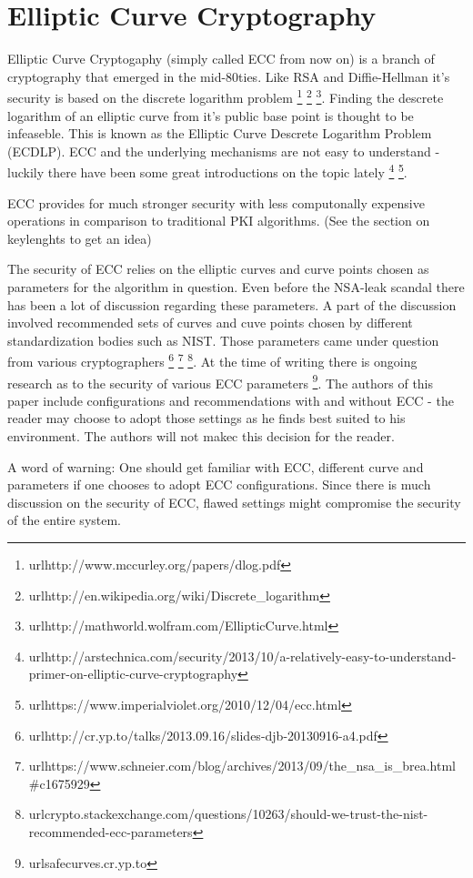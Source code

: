 \section{Elliptic Curve Cryptography}

Elliptic Curve Cryptogaphy (simply called ECC from now on) is a branch of 
cryptography that emerged in the mid-80ties. Like RSA and Diffie-Hellman 
it's security is based on the discrete logarithm problem
\footnote{url{http://www.mccurley.org/papers/dlog.pdf}} 
\footnote{url{http://en.wikipedia.org/wiki/Discrete_logarithm}}
\footnote{url{http://mathworld.wolfram.com/EllipticCurve.html}}.
Finding the descrete logarithm of an elliptic curve from it's public base
point is thought to be infeaseble. This is known as the Elliptic Curve Descrete 
Logarithm Problem (ECDLP). ECC and the underlying mechanisms are not easy 
to understand - luckily there have been some great introductions on the topic lately
\footnote{url{http://arstechnica.com/security/2013/10/a-relatively-easy-to-understand-primer-on-elliptic-curve-cryptography}}
\footnote{url{https://www.imperialviolet.org/2010/12/04/ecc.html}}.

ECC provides for much stronger security with less computonally expensive
operations in comparison to traditional PKI algorithms. (See the section 
on keylenghts to get an idea)

The security of ECC relies on the elliptic curves and curve points chosen
as parameters for the algorithm in question. Even before the NSA-leak scandal
there has been a lot of discussion regarding these parameters. A part of the
discussion involved recommended sets of curves and cuve points chosen by
different standardization bodies such as NIST. Those parameters came under
question from various cryptographers
\footnote{url{http://cr.yp.to/talks/2013.09.16/slides-djb-20130916-a4.pdf}}
\footnote{url{https://www.schneier.com/blog/archives/2013/09/the_nsa_is_brea.html#c1675929}}
\footnote{url{crypto.stackexchange.com/questions/10263/should-we-trust-the-nist-recommended-ecc-parameters}}.
At the time of writing there is ongoing research as to the security of 
various ECC parameters
\footnote{url{safecurves.cr.yp.to}}.
The authors of this paper include configurations and recommendations
with and without ECC - the reader may choose to adopt those settings
as he finds best suited to his environment. The authors will not makec
this decision for the reader.

A word of warning: One should get familiar with ECC, different curve and
parameters if one chooses to adopt ECC configurations. Since there is much 
discussion on the security of ECC, flawed settings might compromise the 
security of the entire system. %


